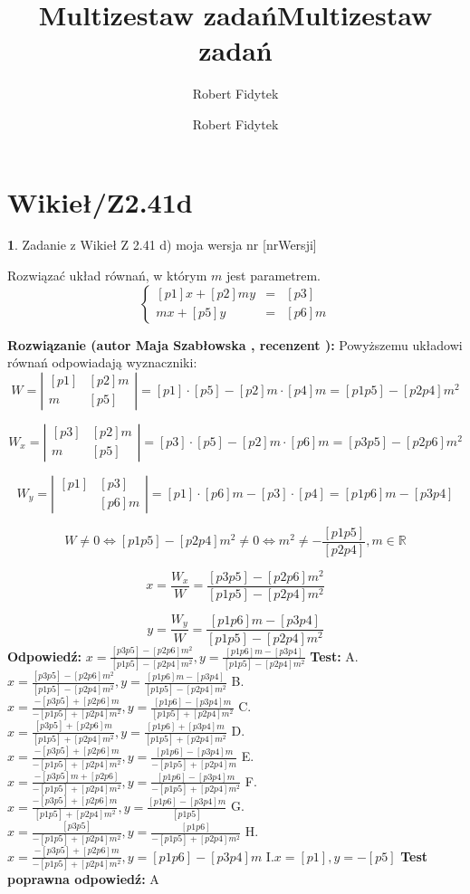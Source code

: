 \documentclass[12pt, a4paper]{article}
\title{Multizestaw zadań}
\author{Robert Fidytek}
\date{}\documentclass[12pt, a4paper]{article}
\title{Multizestaw zadań}
\author{Robert Fidytek}
\date{}
\theoremstyle{definition} %
\newtheorem{zad}{}
\theoremstyle{definition} %
\newtheorem{zad}{}
\newcommand{\kategoria}[1]{\section{#1}} %
\newcommand{\zadStart}[1]{\begin{zad}#1\newline} %
\newcommand{\zadStop}{\end{zad}}   %
\newcommand{\rozwStart}[2]{\noindent \textbf{Rozwiązanie (autor #1 , recenzent #2): }\newline} %
\newcommand{\rozwStop}{\newline}                                            %
\newcommand{\odpStart}{\noindent \textbf{Odpowiedź:}\newline}    %
\newcommand{\odpStop}{\newline}                                             %
\newcommand{\testStart}{\noindent \textbf{Test:}\newline} %
\newcommand{\testStop}{\newline} %
\newcommand{\kluczStart}{\noindent \textbf{Test poprawna odpowiedź:}\newline} %
\newcommand{\kluczStop}{\newline} %
\begin{document}
\maketitle


\kategoria{Wikieł/Z2.41d}
\zadStart{Zadanie z Wikieł Z 2.41 d)  moja wersja nr [nrWersji]}

Rozwiązać układ równań, w którym $m$ jest parametrem.
$$\left\{\begin{array}{ccc}
[p1]x+[p2]my&=&[p3]\\
[p4]mx+[p5]y&=&[p6]m
\end{array} \right.$$

\zadStop
\rozwStart{Maja Szabłowska}{}
Powyższemu układowi równań odpowiadają wyznaczniki:
$$W=\left| \begin{array}{lccr} [p1] & [p2]m \\ [p4]m & [p5] \end{array}\right| = [p1]\cdot[p5] - [p2]m\cdot[p4]m=[p1p5]-[p2p4]m^{2}$$

$$W_{x}=\left| \begin{array}{lccr} [p3] & [p2]m \\ [p6]m & [p5] \end{array}\right| = [p3]\cdot[p5] - [p2]m\cdot[p6]m=[p3p5]-[p2p6]m^{2}$$

$$W_{y}=\left| \begin{array}{lccr} [p1] & [p3] \\ [p4] & [p6]m \end{array}\right| = [p1]\cdot[p6]m - [p3]\cdot[p4]=[p1p6]m-[p3p4]$$

$$W\neq 0 \iff [p1p5]-[p2p4]m^{2} \neq 0  \iff
m^{2}\neq -\frac{[p1p5]}{[p2p4]}, m\in\mathbb{R} $$

$$x=\frac{W_{x}}{W}=\frac{[p3p5]-[p2p6]m^{2}}{[p1p5]-[p2p4]m^{2}}$$

$$y=\frac{W_{y}}{W}=\frac{[p1p6]m-[p3p4]}{[p1p5]-[p2p4]m^{2}}$$
\rozwStop
\odpStart
$x=\frac{[p3p5]-[p2p6]m^{2}}{[p1p5]-[p2p4]m^{2}}, y=\frac{[p1p6]m-[p3p4]}{[p1p5]-[p2p4]m^{2}}$
\odpStop
\testStart
A.$x=\frac{[p3p5]-[p2p6]m^{2}}{[p1p5]-[p2p4]m^{2}}, y=\frac{[p1p6]m-[p3p4]}{[p1p5]-[p2p4]m^{2}}$
B.$x=\frac{-[p3p5]+[p2p6]m}{-[p1p5]+[p2p4]m^{2}}, y=\frac{[p1p6]-[p3p4]m}{[p1p5]+[p2p4]m^{2}}$
C.$x=\frac{[p3p5]+[p2p6]m}{[p1p5]+[p2p4]m^{2}}, y=\frac{[p1p6]+[p3p4]m}{[p1p5]+[p2p4]m^{2}}$
D.$x=\frac{-[p3p5]+[p2p6]m}{-[p1p5]+[p2p4]m^{2}}, y=\frac{[p1p6]-[p3p4]m}{-[p1p5]+[p2p4]m}$
E.$x=\frac{-[p3p5]m+[p2p6]}{-[p1p5]+[p2p4]m^{2}}, y=\frac{[p1p6]-[p3p4]m}{-[p1p5]+[p2p4]m^{2}}$
F.$x=\frac{-[p3p5]+[p2p6]m}{[p1p5]+[p2p4]m^{2}}, y=\frac{[p1p6]-[p3p4]m}{[p1p5]}$
G.$x=\frac{[p3p5]}{-[p1p5]+[p2p4]m^{2}}, y=\frac{[p1p6]}{-[p1p5]+[p2p4]m^{2}}$
H.$x=\frac{-[p3p5]+[p2p6]m}{-[p1p5]+[p2p4]m^{2}}, y=[p1p6]-[p3p4]m$
I.$x=[p1], y=-[p5]$
\testStop
\kluczStart
A
\kluczStop
\end{document}
